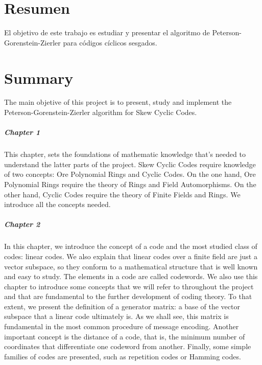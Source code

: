 \chapter*{Resumen}

El objetivo de este trabajo es estudiar y presentar el algoritmo de Peterson-Gorenstein-Zierler para códigos cíclicos sesgados.  

\chapter*{Summary}

The main objetive of this project is to present, study and implement the Peterson-Gorenstein-Zierler algorithm for Skew Cyclic Codes.

\paragraph{Chapter 1} This chapter, sets the foundations of mathematic knowledge that's needed to understand the latter parts of the project. Skew Cyclic Codes require knowledge of two concepts: Ore Polynomial Rings and Cyclic Codes. On the one hand, Ore Polynomial Rings require the theory of Rings and Field Automorphisms. On the other hand, Cyclic Codes require the theory of Finite Fields and Rings. We introduce all the concepts needed.

\paragraph{Chapter 2} In this chapter, we introduce the concept of a code and the most studied class of codes: linear codes.
We also explain that linear codes over a finite field are just a vector subspace, so they conform to a mathematical structure that is well known and easy to study.
The elements in a code are called codewords.
We also use this chapter to introduce some concepts that we will refer to throughout the project and that are fundamental to the further development of coding theory.
To that extent, we present the definition of a generator matrix: a base of the vector subspace that a linear code ultimately is.
As we shall see, this matrix is fundamental in the most common procedure of message encoding.
Another important concept is the distance of a code, that is, the minimum number of coordinates that differentiate one codeword from another.
Finally, some simple families of codes are presented, such as repetition codes or Hamming codes.


